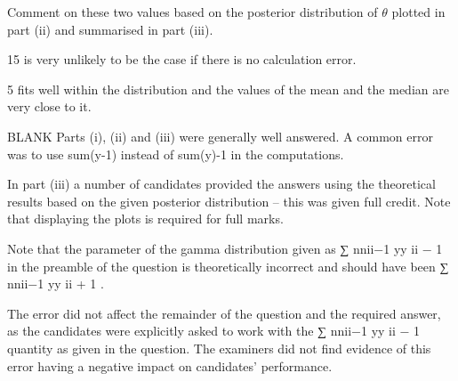 \documentclass[a4paper,12pt]{article}
\begin{document}
Comment on these two values based on the posterior distribution of $\theta$ plotted
in part (ii) and summarised in part (iii).



15 is very unlikely to be the case if there is no calculation error.

5 fits well within the distribution and the values of the mean and the median are very close to it.

\newpage
BLANK
\newpage
Parts (i), (ii) and (iii) were generally well answered. A common error was to use sum(y-1)
instead of sum(y)-1 in the computations. 

In part (iii) a number of candidates provided the
answers using the theoretical results based on the given posterior distribution – this was
given full credit. Note that displaying the plots is required for full marks. 

Note that the parameter of the gamma distribution given as ∑ nnii−1 yy ii − 1 in the preamble of
the question is theoretically incorrect and should have been ∑ nnii−1 yy ii + 1 . 


The error did not
affect the remainder of the question and the required answer, as the candidates were
explicitly asked to work with the ∑ nnii−1 yy ii − 1 quantity as given in the question. The
examiners did not find evidence of this error having a negative impact on candidates’
performance.
\end{document}
